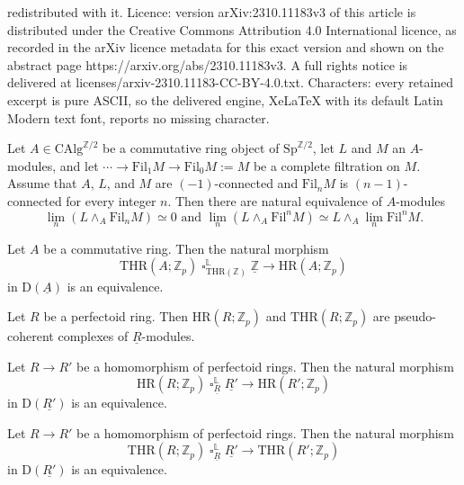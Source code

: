 \documentclass[10pt,a4paper]{amsart}
\DeclareMathOperator{\sotimes}{\square}
\newcommand{\CAlg}{\mathrm{CAlg}}
\newcommand{\Fil}{\mathrm{Fil}}
\newcommand{\HR}{\mathrm{HR}}
\newcommand{\Sp}{\mathrm{Sp}}
\newcommand{\THR}{\mathrm{THR}}
\newcommand{\Z}{\mathbb{Z}}
\newcommand{\rD}{\mathrm{D}}
\newcommand{\ul}{\underline}
\renewcommand{\L}{\mathbb{L}}
\begin{document}
redistributed with it. Licence: version arXiv:2310.11183v3 of this article is distributed under the Creative Commons Attribution 4.0 International licence, as recorded in the arXiv licence metadata for this exact version and shown on the abstract page https://arxiv.org/abs/2310.11183v3. A full rights notice is delivered at licenses/arxiv-2310.11183-CC-BY-4.0.txt. Characters: every retained excerpt is pure ASCII, so the delivered engine, XeLaTeX with its default Latin Modern text font, reports no missing character.
\begin{lem}
\label{limit and smash}
Let $A \in \CAlg^{\Z/2}$ be a commutative ring object of $\Sp^{\Z/2}$,
let $L$ and $M$ an $A$-modules,
and let $\cdots \to \Fil_1 M\to \Fil_0 M:=M$ be a complete filtration on $M$.
Assume that $A$, $L$, and $M$ are $(-1)$-connected and $\Fil_n M$ is $(n-1)$-connected for every integer $n$.
Then there are natural equivalence of $A$-modules
\[
\lim_n (L\wedge_A \Fil_n M)
\simeq
0
\text{ and }
\lim_n (L\wedge_A \Fil^n M)
\simeq
L\wedge_A \lim_n \Fil^n M.
\]
\end{lem}

\begin{prop}
\label{prop:hrcompleted}
Let $A$ be a commutative ring.
Then the natural morphism
\[
\THR(A;\Z_p)
\sotimes_{\THR(\Z)}^\L
\ul{\Z}
\to
\HR(A;\Z_p)
\]
in $\rD(\ul{A})$ is an equivalence.
\end{prop}

\begin{lem}
\label{lem:pseudo-coherence}
Let $R$ be a perfectoid ring.
Then $\HR(R;\Z_p)$ and $\THR(R;\Z_p)$ are pseudo-coherent complexes of $\ul{R}$-modules.
\end{lem}

\begin{lem}
\label{perfectoid basechange HR}
Let $R\to R'$ be a homomorphism of perfectoid rings.
Then the natural morphism
\[
\HR(R;\Z_p)
\sotimes_{\ul{R}}^\L
\ul{R'}
\to
\HR(R';\Z_p)
\]
in $\rD(\ul{R'})$ is an equivalence.
\end{lem}

\begin{lem}
\label{lem:perfectoid basechange}
Let $R\to R'$ be a homomorphism of perfectoid rings.
Then the natural morphism
\[
\THR(R;\Z_p)
\sotimes_{\ul{R}}^\L
\ul{R'}
\to
\THR(R';\Z_p)
\]
in $\rD(\ul{R'})$ is an equivalence.
\end{lem}
\end{document}
